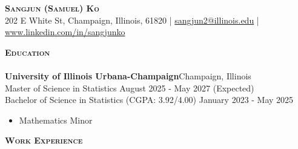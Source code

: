 \documentclass[a4paper]{article}
\newcommand{\lineunder} {
    \vspace*{-8pt} \\
    \hspace*{-18pt} \hrulefill \\
}
\newcommand{\header} [1] {
    {\hspace*{-18pt}\vspace*{6pt} \textsc{#1}}
    \vspace*{-6pt} \lineunder
}
\begin{document}
\vspace*{-40pt}

    

\vspace*{-10pt}
\begin{center}
	{\Huge \scshape \textbf{Sangjun (Samuel) Ko}}\\
    202 E White St, Champaign, Illinois, 61820
    | \href{mailto:sangjun2@illinois.edu}{sangjun2@illinois.edu}
    | \href{https://www.linkedin.com/in/sangjunko}{www.linkedin.com/in/sangjunko}

	  
\end{center}

\header{\textbf{Education}}
\textbf{University of Illinois Urbana-Champaign}\hfill Champaign, Illinois  \\
Master of Science in Statistics \hfill August 2025 - May 2027 (Expected) \\
Bachelor of Science in Statistics (CGPA: 3.92/4.00) \hfill January 2023 - May 2025\\
    \begin{itemize}[noitemsep]
        \item Mathematics Minor
    \end{itemize}


\vspace{2mm}

\header{\textbf{Work Experience}}
\vspace{1mm}
\end{document}
